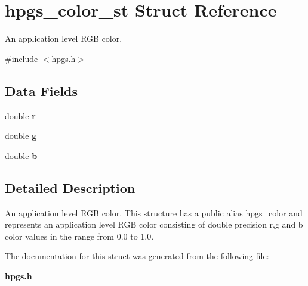 \section{hpgs\_\-color\_\-st Struct Reference}
\label{structhpgs__color__st}


An application level RGB color.  




{\ttfamily \#include $<$hpgs.h$>$}

\subsection*{Data Fields}
\begin{DoxyCompactItemize}
\item 
double {\bfseries r}\label{structhpgs__color__st_a6764850c4a93fbd3feab36f958c5734a}

\item 
double {\bfseries g}\label{structhpgs__color__st_adf3a418d27cf41ebe5257e6409b1c7f1}

\item 
double {\bfseries b}\label{structhpgs__color__st_a3f76215cdf0bc92475c69d4a2449be58}

\end{DoxyCompactItemize}


\subsection{Detailed Description}
An application level RGB color. This structure has a public alias {\ttfamily hpgs\_\-color} and represents an application level RGB color consisting of double precision r,g and b color values in the range from 0.0 to 1.0. 

The documentation for this struct was generated from the following file:\begin{DoxyCompactItemize}
\item 
{\bf hpgs.h}\end{DoxyCompactItemize}
